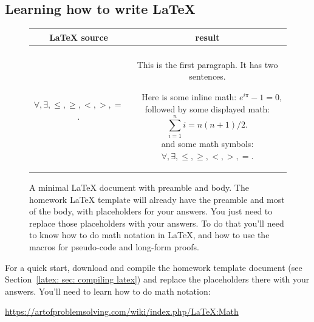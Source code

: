 \subsection{Learning how to write LaTeX}\label{latex: sec: learning latex}
\begin{figure}
\begin{tabular}{|c|c|}
  \multicolumn{1}{c}{LaTeX source} & \multicolumn{1}{c}{result} \\ \hline 
  \begin{minipage}{0.55\textwidth} \small  \smallskip
\begin{verbatim}
\documentclass[11pt]{article}

   % load file named "macros.tex" 

 % start the body of the document

This is the first paragraph.  % a comment
It has two sentences.

Here is some inline math: \(e^{i\pi} =1\),
followed by some displayed math:
\[ \sum_{i=1}^n i = n(n+1)/2 .\]
and some math symbols:  
\\ \( \forall, \exists, \le, \ge, <, >, = \).


\end{verbatim}\smallskip
  \end{minipage}
  &
    \parbox{0.4\textwidth}{
    This is the first paragraph.  
    It has two sentences.

    ~~Here is some inline math: \(e^{i\pi}-1 = 0\),
    followed by some displayed math:
    \[ \sum_{i=1}^n i = n(n+1)/2 .\]
    and some math symbols:  
    \\ \(\forall, \exists, \le, \ge, <, >, =\).
    } \\ \hline
\end{tabular}

\caption{A minimal LaTeX document with preamble and body.
  The homework LaTeX template will already have the preamble and most of the body,
  with placeholders for your answers.  You just need to replace those placeholders
  with your answers.  To do that you'll need to know how to do math notation in
  LaTeX, and how to use the macros for pseudo-code and long-form proofs.
}\label{latex: fig: header}
\end{figure}
For a quick start, download and compile the homework template document
(see Section~\ref{latex: sec: compiling latex}) and replace the placeholders
there with your answers.  You'll need to learn how to do math notation:

\url{https://artofproblemsolving.com/wiki/index.php/LaTeX:Math}

